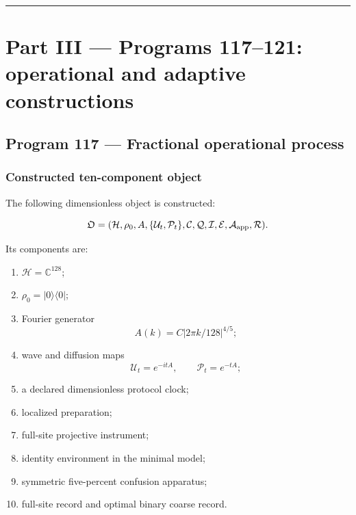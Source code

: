 \documentclass[11pt,a4paper,openany]{report}
\begin{document}
\par\medskip\hrule\medskip

\chapter{Part III --- Programs 117--121: operational and adaptive constructions}

\section{Program 117 --- Fractional operational process}

\subsection{Constructed ten-component object}

The following dimensionless object is constructed:

\[
\mathfrak O
=
(
\mathcal H,\rho_0,A,
\{\mathcal U_t,\mathcal P_t\},
\mathcal C,\mathcal Q,\mathcal I,
\mathcal E,\mathcal A_{\rm app},\mathcal R
).
\]

Its components are:

\begin{enumerate}
\item 
\(\mathcal H=\mathbb C^{128}\);

\item 
\(\rho_0=|0\rangle\langle0|\);

\item 
Fourier generator \[
   A(k)=C|2\pi k/128|^{4/5};
   \]

\item 
wave and diffusion maps \[
   \mathcal U_t=e^{-itA},
   \qquad
   \mathcal P_t=e^{-tA};
   \]

\item 
a declared dimensionless protocol clock;

\item 
localized preparation;

\item 
full-site projective instrument;

\item 
identity environment in the minimal model;

\item 
symmetric five-percent confusion apparatus;

\item 
full-site record and optimal binary coarse record.

\end{enumerate}
\end{document}
